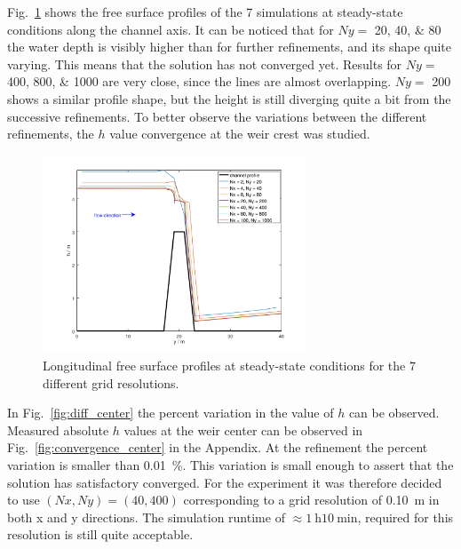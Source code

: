 Fig.~\ref{fig:water_profiles} shows the free surface profiles of the \num{7} simulations at steady-state conditions along the channel axis.
It can be noticed that for $Ny =$ \numlist{20;40;80} the water depth is visibly higher than for further refinements, and its shape quite varying.
This means that the solution has not converged yet.
Results for $Ny =$ \numlist{400;800;1000} are very close, since the lines are almost overlapping.
$Ny =$ \num{200} shows a similar profile shape, but the height is still diverging quite a bit from the successive refinements.
To better observe the variations between the different refinements, the $h$ value convergence at the weir crest was studied.

\begin{figure}[h]
  \centering
  \includegraphics[width=0.7\textwidth]{Figures/water_profiles.png}
  \caption{Longitudinal free surface profiles at steady-state conditions for the \num{7} different grid resolutions.}
  \label{fig:water_profiles}
\end{figure}

In Fig.~\ref{fig:diff_center} the percent variation in the value of $h$ can be observed.
Measured absolute $h$ values at the weir center can be observed in Fig.~\ref{fig:convergence_center} in the Appendix. 
At the  refinement the percent variation is smaller than \SI{0.01}{\percent}.
This variation is small enough to assert that the solution has satisfactory converged.
For the experiment it was therefore decided to use $(Nx, Ny) = (\num{40}, \num{400})$ corresponding to a grid resolution of \SI{0.10}{\m} in both x and y directions. The simulation runtime of $\approx \SI{1}{\hour} \SI{10}{\minute}$, required for this resolution is still quite acceptable.

